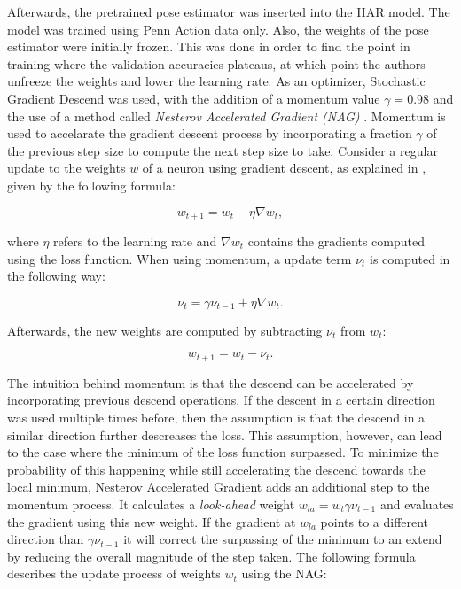 Afterwards, the pretrained pose estimator was inserted into the HAR model.
The model was trained using Penn Action data only.
Also, the weights of the pose estimator were initially frozen.
This was done in order to find the point in training where the validation accuracies plateaus, at which point the authors unfreeze the weights and lower the learning rate.
As an optimizer, Stochastic Gradient Descend was used, with the addition of a momentum value $\gamma = 0.98$ and the use of a method called \textit{Nesterov Accelerated Gradient (NAG)} \cite{nesterov_method_1983}.
Momentum is used to accelarate the gradient descent process by incorporating a fraction $\gamma$ of the previous step size to compute the next step size to take.
Consider a regular update to the weights $w$ of a neuron using gradient descent, as explained in , given by the following formula:

\begin{equation}
    w_{t+1} = w_t - \eta \nabla w_t,
\end{equation}

where $\eta$ refers to the learning rate and $\nabla w_t$ contains the gradients computed using the loss function.
When using momentum, a update term $\nu_t$ is computed in the following way:

\begin{equation}
    \nu_t = \gamma \nu_{t-1} + \eta \nabla w_t.
\end{equation}

Afterwards, the new weights are computed by subtracting $\nu_t$ from $w_t$:

\begin{equation}
    w_{t+1} = w_t - \nu_t.
\end{equation}

The intuition behind momentum is that the descend can be accelerated by incorporating previous descend operations.
If the descent in a certain direction was used multiple times before, then the assumption is that the descend in a similar direction further descreases the loss.
This assumption, however, can lead to the case where the minimum of the loss function surpassed.
To minimize the probability of this happening while still accelerating the descend towards the local minimum, Nesterov Accelerated Gradient adds an additional step to the momentum process.
It calculates a \textit{look-ahead} weight $w_{la} = w_{t} \gamma \nu_{t-1}$ and evaluates the gradient using this new weight.
If the gradient at $w_{la}$ points to a different direction than $\gamma \nu_{t-1}$ it will correct the surpassing of the minimum to an extend by reducing the overall magnitude of the step taken.
The following formula describes the update process of weights $w_t$ using the NAG:

